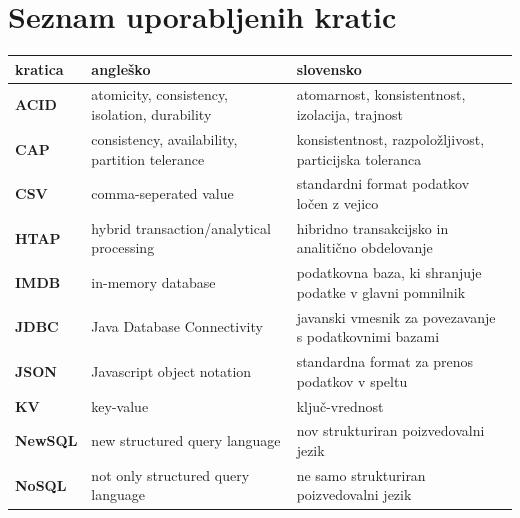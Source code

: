 \documentclass[a4paper, 12pt]{book}
\newcommand{\clearemptydoublepage}{\newpage{\pagestyle{empty}\cleardoublepage}}
\begin{document}
\vspace{2cm}


\clearemptydoublepage


\pagestyle{empty}
\def\thepage{}%
\tableofcontents{}


\clearemptydoublepage


\chapter*{Seznam uporabljenih kratic}  %

\noindent\begin{longtable}{p{}|p{}|p{}}
    {\bf kratica} & {\bf angleško}
        & {\bf slovensko}
        \\ \hline
    {\bf ACID}  & atomicity, consistency, isolation, durability
        & atomarnost, konsistentnost, izolacija, trajnost
        \\
    {\bf CAP}   & consistency, availability, partition telerance
        & konsistentnost, razpoložljivost, particijska toleranca 
        \\
    {\bf CSV}   & comma-seperated value
        & standardni format podatkov ločen z vejico
        \\
    {\bf HTAP}  & hybrid transaction/analytical processing
        & hibridno transakcijsko in analitično obdelovanje
        \\
    {\bf IMDB}  & in-memory database
        & podatkovna baza, ki shranjuje podatke v glavni pomnilnik
        \\
    {\bf JDBC}  & Java Database Connectivity
        & javanski vmesnik za povezavanje s podatkovnimi bazami
        \\
    {\bf JSON}  & Javascript object notation
        &  standardna format za prenos podatkov v speltu\\
    {\bf KV}    & key-value
        & ključ-vrednost \\
    {\bf NewSQL}& new structured query language
        & nov strukturiran poizvedovalni jezik
        \\
    {\bf NoSQL} & not only structured query language
        & ne samo strukturiran poizvedovalni jezik
        \\

\end{longtable}
\end{document}
